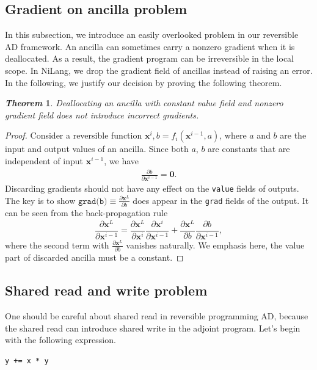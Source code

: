 \documentclass{article}
\newcommand{\<}{\langle}
\renewcommand{\>}{\rangle}
\newcommand{\vx}{{\mathbf{x}}}
\newtheorem{theorem}{\textit{Theorem}}
\theoremstyle{definition}\newtheorem{definition}{\textit{Definition}}
\begin{document}
\subsection{Gradient on ancilla problem}
In this subsection, we introduce an easily overlooked problem in our reversible AD framework.
An ancilla can sometimes carry a nonzero gradient when it is deallocated. As a result, the gradient program can be irreversible in the local scope.
In NiLang, we drop the gradient field of ancillas instead of raising an error.
In the following, we justify our decision by proving the following theorem.
\begin{theorem}
    Deallocating an ancilla with constant value field and nonzero gradient field does not introduce incorrect gradients.
\end{theorem}
\begin{proof}
    Consider a reversible function $\vx^i, b = f_i(\vx^{i-1}, a)$, where $a$ and $b$ are the input and output values of an ancilla.
    Since both $a$, $b$ are constants that are independent of input $\vx^{i-1}$, we have
\begin{align}
    \frac{\partial b}{\partial \vx^{i-1}} = \mathbf{0}.
\end{align}
Discarding gradients should not have any effect on the \texttt{value} fields of outputs.
    The key is to show $\texttt{grad(b)} \equiv \frac{\partial \vx^L}{\partial{b}}$ does appear in the \texttt{grad} fields of the output. It can be seen from the back-propagation rule 
\begin{equation}
    \frac{\partial \vx^L}{\partial \vx^{i-1}} = \frac{\partial \vx^L}{\partial \vx^i}\frac{\partial \vx^i}{\partial \vx^{i-1}} + \frac{\partial \vx^L}{\partial b}\frac{\partial b}{\partial \vx^{i-1}},
\end{equation}
where the second term with $\frac{\partial \vx^L}{\partial{b}}$ vanishes naturally. We emphasis here, the value part of discarded ancilla must be a constant.
\end{proof}

\subsection{Shared read and write problem}\label{sec:sharedrw}
One should be careful about shared read in reversible programming AD, because the shared read can introduce shared write in the adjoint program.
Let's begin with the following expression.

\begin{minipage}{.88\columnwidth}
\begin{lstlisting}
y += x * y
\end{lstlisting}
\end{minipage}
\end{document}
